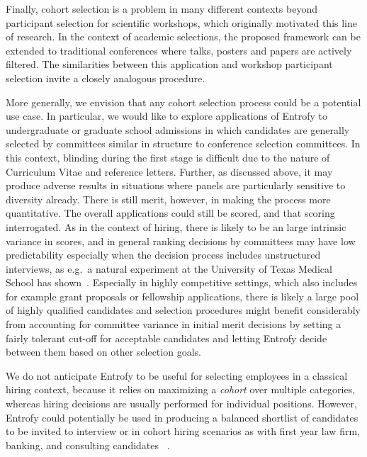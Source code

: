 \documentclass[12pt]{article}
\begin{document}
\begin{bf}
Finally, cohort selection is a problem in many different contexts beyond participant selection for scientific workshops, which originally motivated this line of research.
In the context of academic selections, the proposed framework can be extended to traditional conferences where talks, posters and papers are actively filtered.
The similarities between this application and workshop participant selection invite a closely analogous procedure.

More generally, we envision that any cohort selection process could be a potential use case.
In particular, we would like to explore applications of Entrofy to undergraduate or graduate school admissions in which candidates are generally selected by committees similar in structure to conference selection committees.
In this context, blinding during the first stage is difficult due to the nature of Curriculum Vitae and reference letters. Further, as discussed above, it may produce adverse results in situations where panels are particularly sensitive to diversity already.
There is still merit, however, in making the process more quantitative.
The overall applications could still be scored, and that scoring interrogated.
As in the context of hiring, there is likely to be an large intrinsic variance in scores, and in general ranking decisions by committees may have low predictability especially when the decision process includes unstructured interviews, as e.g.\ a natural experiment at the University of Texas Medical School has shown~\cite{devaul1987medical}.
Especially in highly competitive settings, which also includes for example grant proposals or fellowship applications, there is likely a large pool of highly qualified candidates and selection procedures might benefit considerably from accounting for committee variance in initial merit decisions by setting a fairly tolerant cut-off for acceptable candidates and letting Entrofy decide between them based on other selection goals.

We do not anticipate Entrofy to be useful for selecting employees in a classical hiring context, because it relies on maximizing a \textit{cohort} over multiple categories, whereas hiring decisions are usually performed for individual positions.
However, Entrofy could potentially be used in producing a balanced shortlist of candidates to be invited to interview or in cohort hiring scenarios as with first year law firm, banking, and consulting candidates ~\cite{rivera2015}.
\end{bf}
\end{document}
